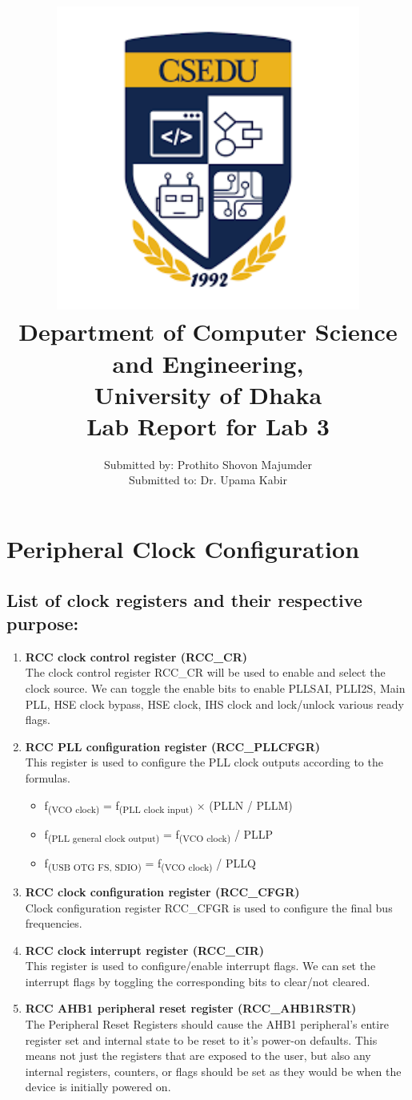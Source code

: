 \documentclass[12pt]{article}
\title{
{\includegraphics[width=12cm, height=10cm]{images/csedu_logo.png}}\\
{\large Department of Computer Science and Engineering,\\      University of Dhaka}\\
{ Lab Report for Lab 3 }
}
\author{ Submitted by: Prothito Shovon Majumder \\ Submitted to: Dr. Upama Kabir }
\begin{document}
\maketitle

\newpage
\section{Peripheral Clock Configuration}

\subsection{List of clock registers and their respective purpose:}

\begin{enumerate}
    \item \textbf{RCC clock control register (RCC\_CR)}
    \\ The clock control register RCC\_CR will be used to enable and select the clock source. We can toggle the enable bits to enable PLLSAI, PLLI2S, Main PLL, HSE clock bypass, HSE clock, IHS clock and lock/unlock various ready flags.
    \item \textbf{RCC PLL configuration register (RCC\_PLLCFGR)}
    \\ This register is used to configure the PLL clock outputs according to the formulas.
        \begin{itemize}
            \item f\textsubscript{(VCO clock)} = f\textsubscript{(PLL clock input)} × (PLLN / PLLM)
            \item f\textsubscript{(PLL general clock output)} = f\textsubscript{(VCO clock)} / PLLP
            \item f\textsubscript{(USB OTG FS, SDIO)} = f\textsubscript{(VCO clock)} / PLLQ
        \end{itemize}
    \item \textbf{RCC clock configuration register (RCC\_CFGR)}
    \\  Clock configuration register RCC\_CFGR is used to configure the final bus frequencies. 
    \item\textbf{RCC clock interrupt register (RCC\_CIR)}
    \\ This register is used to configure/enable interrupt flags. We can set the interrupt flags by toggling the corresponding bits to clear/not cleared.
    \item\textbf{RCC AHB1 peripheral reset register (RCC\_AHB1RSTR)}
    \\ The Peripheral Reset Registers should cause the AHB1 peripheral's entire register set and internal state to be reset to it's power-on defaults. This means not just the registers that are exposed to the user, but also any internal registers, counters, or flags should be set as they would be when the device is initially powered on.

\end{enumerate}
\end{document}
